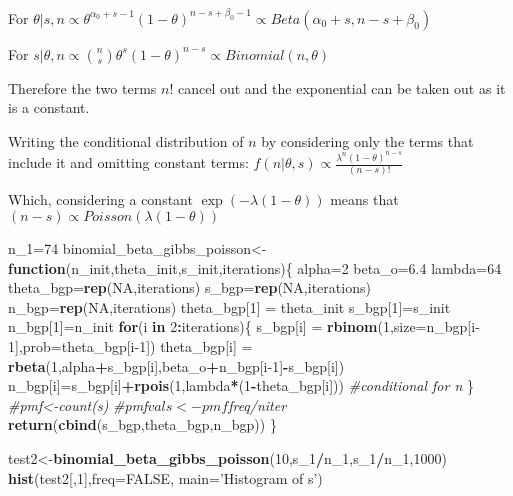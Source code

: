 \documentclass[
]{article}
\newenvironment{Shaded}{\begin{snugshade}}{\end{snugshade}}
\newcommand{\CommentTok}[1]{\textcolor[rgb]{0.56,0.35,0.01}{\textit{#1}}}
\newcommand{\ControlFlowTok}[1]{\textcolor[rgb]{0.13,0.29,0.53}{\textbf{#1}}}
\newcommand{\DataTypeTok}[1]{\textcolor[rgb]{0.13,0.29,0.53}{#1}}
\newcommand{\DecValTok}[1]{\textcolor[rgb]{0.00,0.00,0.81}{#1}}
\newcommand{\FloatTok}[1]{\textcolor[rgb]{0.00,0.00,0.81}{#1}}
\newcommand{\KeywordTok}[1]{\textcolor[rgb]{0.13,0.29,0.53}{\textbf{#1}}}
\newcommand{\NormalTok}[1]{#1}
\newcommand{\OperatorTok}[1]{\textcolor[rgb]{0.81,0.36,0.00}{\textbf{#1}}}
\newcommand{\OtherTok}[1]{\textcolor[rgb]{0.56,0.35,0.01}{#1}}
\newcommand{\StringTok}[1]{\textcolor[rgb]{0.31,0.60,0.02}{#1}}
\begin{document}
For
\(\theta \vert s,n \propto \theta^{\alpha_0+s-1}(1-\theta)^{n-s+\beta_0-1} \propto Beta(\alpha_0+s,n-s+\beta_0)\)

For
\(s \vert \theta,n \propto {n\choose s} \theta^{s}(1-\theta)^{n-s} \propto Binomial (n,\theta)\)

Therefore the two terms \(n!\) cancel out and the exponential can be
taken out as it is a constant.

Writing the conditional distribution of \(n\) by considering only the
terms that include it and omitting constant terms:
\(f(n\vert\theta,s) \propto \frac{\lambda^{n}(1-\theta)^{n-s}}{(n-s)!}\)

Which, considering a constant \(\exp (-\lambda(1-\theta))\) means that
\((n-s) \propto Poisson(\lambda(1-\theta))\)

\begin{Shaded}
\begin{Highlighting}[]
\NormalTok{n_}\DecValTok{1}\NormalTok{=}\DecValTok{74}
\NormalTok{binomial_beta_gibbs_poisson<-}\ControlFlowTok{function}\NormalTok{(n_init,theta_init,s_init,iterations)\{}
\NormalTok{alpha=}\DecValTok{2}
\NormalTok{beta_o=}\FloatTok{6.4}
\NormalTok{lambda=}\DecValTok{64}
\NormalTok{  theta_bgp=}\KeywordTok{rep}\NormalTok{(}\OtherTok{NA}\NormalTok{,iterations)}
\NormalTok{  s_bgp=}\KeywordTok{rep}\NormalTok{(}\OtherTok{NA}\NormalTok{,iterations)}
\NormalTok{  n_bgp=}\KeywordTok{rep}\NormalTok{(}\OtherTok{NA}\NormalTok{,iterations)}
\NormalTok{    theta_bgp[}\DecValTok{1}\NormalTok{] =}\StringTok{ }\NormalTok{theta_init}
\NormalTok{    s_bgp[}\DecValTok{1}\NormalTok{]=s_init}
\NormalTok{    n_bgp[}\DecValTok{1}\NormalTok{]=n_init}
  \ControlFlowTok{for}\NormalTok{(i }\ControlFlowTok{in} \DecValTok{2}\OperatorTok{:}\NormalTok{iterations)\{}
\NormalTok{    s_bgp[i] =}\StringTok{ }\KeywordTok{rbinom}\NormalTok{(}\DecValTok{1}\NormalTok{,}\DataTypeTok{size=}\NormalTok{n_bgp[i}\DecValTok{-1}\NormalTok{],}\DataTypeTok{prob=}\NormalTok{theta_bgp[i}\DecValTok{-1}\NormalTok{])}
\NormalTok{    theta_bgp[i] =}\StringTok{ }\KeywordTok{rbeta}\NormalTok{(}\DecValTok{1}\NormalTok{,alpha}\OperatorTok{+}\NormalTok{s_bgp[i],beta_o}\OperatorTok{+}\NormalTok{n_bgp[i}\DecValTok{-1}\NormalTok{]}\OperatorTok{-}\NormalTok{s_bgp[i])}
\NormalTok{    n_bgp[i]=s_bgp[i]}\OperatorTok{+}\KeywordTok{rpois}\NormalTok{(}\DecValTok{1}\NormalTok{,lambda}\OperatorTok{*}\NormalTok{(}\DecValTok{1}\OperatorTok{-}\NormalTok{theta_bgp[i])) }\CommentTok{#conditional for n}
\NormalTok{  \}}
  \CommentTok{#pmf<-count(s)}
  \CommentTok{#pmf$vals<-pmf$freq/niter}
 \KeywordTok{return}\NormalTok{(}\KeywordTok{cbind}\NormalTok{(s_bgp,theta_bgp,n_bgp))}
\NormalTok{\}}

\NormalTok{test2<-}\KeywordTok{binomial_beta_gibbs_poisson}\NormalTok{(}\DecValTok{10}\NormalTok{,s_}\DecValTok{1}\OperatorTok{/}\NormalTok{n_}\DecValTok{1}\NormalTok{,s_}\DecValTok{1}\OperatorTok{/}\NormalTok{n_}\DecValTok{1}\NormalTok{,}\DecValTok{1000}\NormalTok{)}
\KeywordTok{hist}\NormalTok{(test2[,}\DecValTok{1}\NormalTok{],}\DataTypeTok{freq=}\OtherTok{FALSE}\NormalTok{, }\DataTypeTok{main=}\StringTok{'Histogram of s'}\NormalTok{)}
\end{Highlighting}
\end{Shaded}
\end{document}
